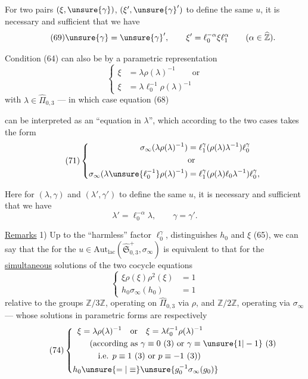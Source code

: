 For two pairs $(\xi,\unsure{\gamma})$, $(\xi',\unsure{\gamma}')$ to define the same $u$, it is necessary and sufficient that we have
\[
\tag{69}
\unsure{\gamma}=\unsure{\gamma}',\qquad
\xi'=\ell_0^{-\alpha}\xi \ell_1^\alpha\qquad(\alpha\in\widehat{\mathbb Z}).
\]

Condition (64) can also be  by a parametric representation
\[
\tag{70}
\left\{
\begin{aligned}
\xi&=\lambda\rho(\lambda)^{-1}\qquad\text{or}\\
\xi&=\lambda \ell_0^{-1}\rho(\lambda)^{-1}
\end{aligned}
\right.
\]
with $\lambda\in\widehat{\Pi}_{0,3}$ --- in which case equation (68)


can be interpreted as an ``equation in $\lambda$'', which according to the two cases takes the form
\[
\tag{71}
\left\{
\begin{aligned}
\sigma_\infty(\lambda\rho(\lambda)^{-1})
 &=\ell_1^\gamma(\rho(\lambda)\lambda^{-1})\ell_0^\gamma\\
&\text{or}\\
\sigma_\infty(\lambda\unsure{\ell_0^{-1}}\rho(\lambda)^{-1})
 &=\ell_1^\gamma(\rho(\lambda)\ell_0\lambda^{-1})\ell_0^\gamma,
\end{aligned}
\right.
\]

Here for $(\lambda,\gamma)$ and $(\lambda',\gamma')$ to define the same $u$, it is necessary and sufficient that we have 
\[
\tag{72}
\lambda'=\ell_0^{-\alpha}\lambda,\qquad\gamma=\gamma'.
\]

\uline{Remarks} 1) Up to the ``harmless'' factor $\ell_0^\gamma$,  distinguishes $h_0$ and $\xi$ (65), we can say that the  for the
$u\in\mathrm{Aut}_{\mathrm{lac}}(\widehat{\mathfrak S}_{0,3}^{+},\sigma_\infty)$
is equivalent to that for the  \uline{simultaneous} solutions of the two cocycle equations
\[
\tag{73}
\left\{
\begin{aligned}
\xi\rho(\xi)\rho^2(\xi)&=1\\
h_0\sigma_\infty(h_0)&=1
\end{aligned}
\right.
\]
relative  to the groups $\mathbb Z/3\mathbb Z$, operating on $\widehat{\Pi}_{0,3}$ via $\rho$, and $\mathbb Z/2\mathbb Z$, operating via $\sigma_\infty$ --- whose solutions in parametric forms are respectively
\[
\tag{74}
\left\{
\begin{aligned}
\xi&=\lambda\rho(\lambda)^{-1}\quad\text{or}\quad
 \xi=\lambda \ell_0^{-1}\rho(\lambda)^{-1}\\
&\quad\text{(according as }\gamma\equiv0\ (3)\text{ or }\gamma\equiv\unsure{1|-1}\ (3)\\
&\qquad\text{i.e. }p\equiv1\ (3)\text{ or }p\equiv-1\ (3)\text{)}\\
h_0&\unsure{=|\equiv}\unsure{g_0^{-1}\sigma_\infty(g_0)}
\end{aligned}
\right.
\]


